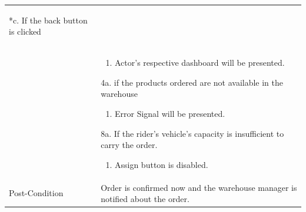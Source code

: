 \documentclass[12pt,a4paper]{report}
\begin{document}
\begin{tabular}{ | m{3cm} | m{12cm}| }
\begin{enumerate}
	\end{enumerate}

*c. If the back button is clicked\\

& \begin{enumerate}

		\item Actor's respective dashboard will be presented.

	\end{enumerate}

4a. if the products ordered are not available in the warehouse

 	\begin{enumerate}

		\item Error Signal will be presented.

	\end{enumerate}

8a. If the rider's vehicle's capacity is insufficient to carry the order.

 	\begin{enumerate}

		\item Assign button is disabled.

	\end{enumerate}

\\ \hline

Post-Condition &  Order is confirmed now and the warehouse manager is notified about the order.\\ \hline

\end{tabular}
\end{document}
